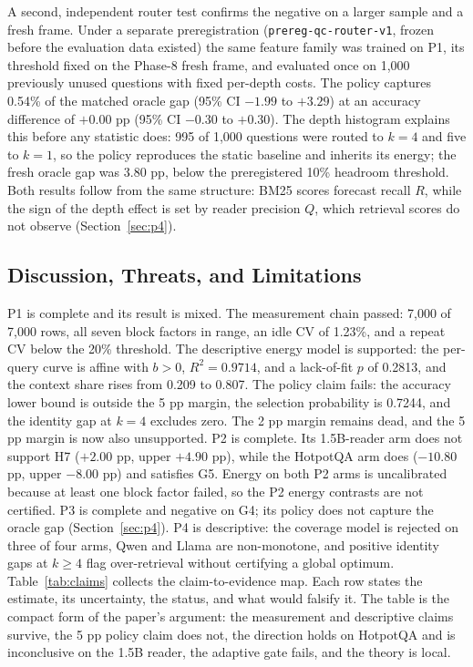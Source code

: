 \documentclass[a4paper,fleqn]{cas-sc}
\begin{document}
A second, independent router test confirms the negative on a larger sample and a fresh frame. Under a separate preregistration (\texttt{prereg-qc-router-v1}, frozen before the evaluation data existed) the same feature family was trained on P1, its threshold fixed on the Phase-8 fresh frame, and evaluated once on 1{,}000 previously unused questions with fixed per-depth costs. The policy captures 0.54\% of the matched oracle gap (95\% CI $-1.99$ to $+3.29$) at an accuracy difference of $+0.00$ pp (95\% CI $-0.30$ to $+0.30$). The depth histogram explains this before any statistic does: 995 of 1{,}000 questions were routed to $k=4$ and five to $k=1$, so the policy reproduces the static baseline and inherits its energy; the fresh oracle gap was 3.80 pp, below the preregistered 10\% headroom threshold. Both results follow from the same structure: BM25 scores forecast recall $R$, while the sign of the depth effect is set by reader precision $Q$, which retrieval scores do not observe (Section~\ref{sec:p4}).

\subsection{Discussion, Threats, and Limitations}\label{sec:discussion}\label{sec:discussion-body}\label{sec:threats}\label{sec:limitations}\label{sec:status}

P1 is complete and its result is mixed. The measurement chain passed: 7{,}000 of 7{,}000 rows, all seven block factors in range, an idle CV of 1.23\%, and a repeat CV below the 20\% threshold. The descriptive energy model is supported: the per-query curve is affine with $b>0$, $R^{2}=0.9714$, and a lack-of-fit $p$ of 0.2813, and the context share rises from 0.209 to 0.807. The policy claim fails: the accuracy lower bound is outside the 5 pp margin, the selection probability is 0.7244, and the identity gap at $k=4$ excludes zero. The 2 pp margin remains dead, and the 5 pp margin is now also unsupported. P2 is complete. Its 1.5B-reader arm does not support H7 ($+2.00$ pp, upper $+4.90$ pp), while the HotpotQA arm does ($-10.80$ pp, upper $-8.00$ pp) and satisfies G5. Energy on both P2 arms is uncalibrated because at least one block factor failed, so the P2 energy contrasts are not certified. P3 is complete and negative on G4; its policy does not capture the oracle gap (Section~\ref{sec:p4}). P4 is descriptive: the coverage model is rejected on three of four arms, Qwen and Llama are non-monotone, and positive identity gaps at $k\ge4$ flag over-retrieval without certifying a global optimum. Table~\ref{tab:claims} collects the claim-to-evidence map. Each row states the estimate, its uncertainty, the status, and what would falsify it. The table is the compact form of the paper's argument: the measurement and descriptive claims survive, the 5 pp policy claim does not, the direction holds on HotpotQA and is inconclusive on the 1.5B reader, the adaptive gate fails, and the theory is local.
\end{document}
